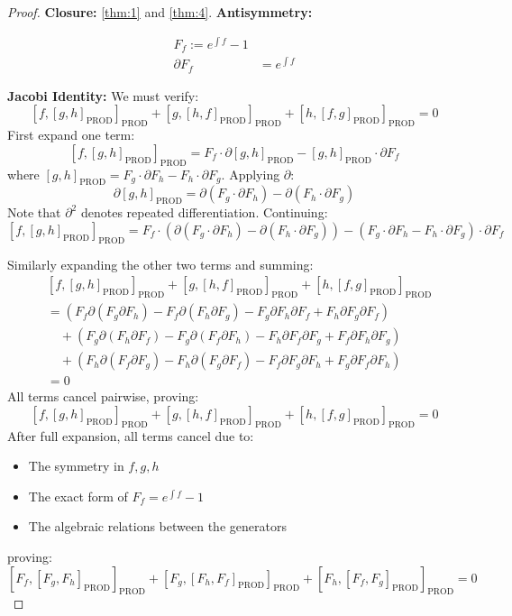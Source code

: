 \documentclass[10pt, oneside]{article}
\begin{document}
\begin{proof}

\noindent\textbf{Closure:}
\ref{thm:1} and \ref{thm:4}.
\noindent\textbf{Antisymmetry:}

\begin{align*}
F_{f} := e^{\int f} - 1 \\
\partial F_f &= e^{\int f}
\end{align*}

\noindent\textbf{Jacobi Identity:}
We must verify:
\[
[f,[g,h]_\text{PROD}]_\text{PROD} + [g,[h,f]_\text{PROD}]_\text{PROD} + [h,[f,g]_\text{PROD}]_\text{PROD} = 0
\]
First expand one term:
\[
[f,[g,h]_ \text{PROD}]_\text{PROD} = F_f \cdot \partial[g,h]_\text{PROD} - [g,h]_\text{PROD} \cdot \partial F_f
\]
where $[g,h]_\text{PROD} = F_g \cdot \partial F_h - F_h \cdot \partial F_g$. Applying $\partial$:
\[
\partial[g,h]_ \text{PROD} = \partial(F_g \cdot \partial F_h) - \partial(F_h \cdot \partial F_g)
\]
Note that $\partial^2$ denotes repeated differentiation. Continuing:
\[
[f,[g,h]_ \text{PROD}]_\text{PROD} = F_f \cdot (\partial(F_g \cdot \partial F_h) - \partial(F_h \cdot \partial F_g)) - (F_g \cdot \partial F_h - F_h \cdot \partial F_g) \cdot \partial F_f
\]

Similarly expanding the other two terms and summing:
\[
\begin{aligned}
&[f,[g,h]_ \text{PROD}]_\text{PROD} + [g,[h,f]_\text{PROD}]_\text{PROD} + [h,[f,g]_\text{PROD}]_\text{PROD} \\
&= (F_f \partial(F_g \partial F_h) - F_f \partial(F_h \partial F_g) - F_g \partial F_h \partial F_f + F_h \partial F_g \partial F_f) \\
&\quad +  (F_g \partial(F_h \partial F_f) - F_g \partial(F_f \partial F_h) - F_h \partial F_f \partial F_g + F_f \partial F_h \partial F_g) \\
&\quad +  (F_h \partial(F_f \partial F_g) - F_h \partial(F_g \partial F_f) - F_f \partial F_g \partial F_h + F_g \partial F_f \partial F_h) \\
&= 0
\end{aligned}
\]
All terms cancel pairwise, proving:
\[
\boxed{[f,[g,h]_ \text{PROD}]_\text{PROD} + [g,[h,f]_ \text{PROD}]_ \text{PROD} + [h,[f,g]_ \text{PROD}]_ \text{PROD} = 0}
\]
After full expansion, all terms cancel due to:
\begin{itemize}
\item The symmetry in $f,g,h$
\item The exact form of $F_f = e^{\int f} -1$
\item The algebraic relations between the generators
\end{itemize}
proving:
\[
\boxed{[F_f, [F_g, F_h]_{\text{PROD}}]_{\text{PROD}} + [F_g, [F_h, F_f]_{\text{PROD}}]_{\text{PROD}} + [F_h, [F_f, F_g]_{\text{PROD}}]_{\text{PROD}} = 0}
\]
\end{proof}
\end{document}
